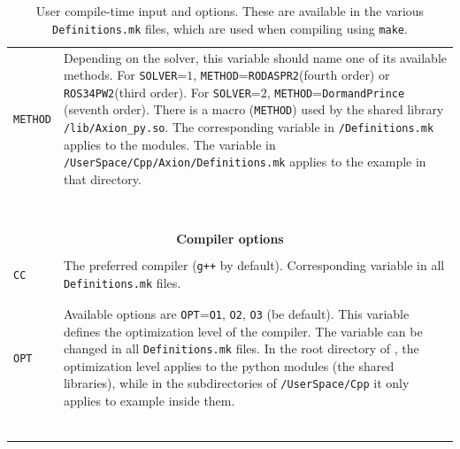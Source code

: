 \documentclass[11pt,a4paper]{article}
\begin{document}
\begin{table}[h!]
\begin{tabular}{l l}
		{\tt METHOD}& \multirow{1}{12cm}{Depending on the solver, this variable should name one of its available methods. For {\tt SOLVER}=$1$, {\tt METHOD}={\tt RODASPR2}(fourth order) or {\tt ROS34PW2}(third order). For {\tt SOLVER}=$2$, {\tt METHOD}={\tt DormandPrince }(seventh order). There is a macro ({\tt METHOD}) used by the shared library {\tt \mimes/lib/Axion\_py.so}. The corresponding variable in {\tt \mimes/Definitions.mk} applies to the \PY modules. The variable in {\tt \mimes/UserSpace/Cpp/Axion/Definitions.mk} applies to the example in that directory.}\\\\\\\\\\\\\\\\
		 		
		\hline\\[-0.4cm]
		
		\multicolumn{2}{c}{\bf Compiler options}  \\
		\hline\\[-0.4cm]
		
		{\tt CC} &  \multirow{1}{12cm}{The preferred \CPP compiler ({\tt g++} by default). Corresponding variable in all {\tt Definitions.mk} files.} \\\\
		\hline\\[-0.4cm]
		
		{\tt OPT} &  \multirow{1}{12cm}{Available options are {\tt OPT}={\tt O1}, {\tt O2}, {\tt O3} (be default). This variable defines the optimization level of the compiler. The variable can be changed in all {\tt Definitions.mk} files. In the root directory of \mimes, the optimization level applies to the python modules (\ie the shared libraries), while in the subdirectories of {\tt \mimes/UserSpace/Cpp} it only applies to example inside them.}   \\\\\\\\\\\\
		\hline\\[-0.4cm]

	\end{tabular}
	\caption{User compile-time input and options. These are available in the various {\tt Definitions.mk} files, which are used when compiling using {\tt make}.}
	\label{tab:compile_time-options}
\end{table}



\pagebreak
{}
                        
\end{document}
